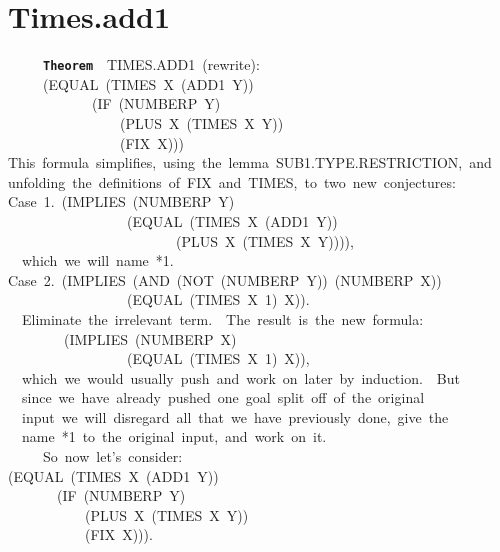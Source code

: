 \documentclass[11pt]{book}
\newenvironment{pubasis}{\begin{flushleft}\ttfamily\small}{\normalsize\rmfamily\end{flushleft}}
\newcommand{\axiomordefinition}[1]{\vspace{6pt}\texttt{\textbf{#1}}}
\newcommand{\pubdefaulttextsize}{\large}
\begin{document}
\section{Times.add1}
\pubdefaulttextsize
\begin{pubasis}
~~~~~\axiomordefinition{Theorem}~~TIMES.ADD1~(rewrite):\\
~~~~~(EQUAL~(TIMES~X~(ADD1~Y))\\
~~~~~~~~~~~~(IF~(NUMBERP~Y)\\
~~~~~~~~~~~~~~~~(PLUS~X~(TIMES~X~Y))\\
~~~~~~~~~~~~~~~~(FIX~X)))\\

This~formula~simplifies,~using~the~lemma~SUB1.TYPE.RESTRICTION,~and\\
unfolding~the~definitions~of~FIX~and~TIMES,~to~two~new~conjectures:\\

Case~1.~(IMPLIES~(NUMBERP~Y)\\
~~~~~~~~~~~~~~~~~(EQUAL~(TIMES~X~(ADD1~Y))\\
~~~~~~~~~~~~~~~~~~~~~~~~(PLUS~X~(TIMES~X~Y)))),\\

~~which~we~will~name~*1.\\

Case~2.~(IMPLIES~(AND~(NOT~(NUMBERP~Y))~(NUMBERP~X))\\
~~~~~~~~~~~~~~~~~(EQUAL~(TIMES~X~1)~X)).\\

~~Eliminate~the~irrelevant~term.~~The~result~is~the~new~formula:\\

~~~~~~~~(IMPLIES~(NUMBERP~X)\\
~~~~~~~~~~~~~~~~~(EQUAL~(TIMES~X~1)~X)),\\

~~which~we~would~usually~push~and~work~on~later~by~induction.~~But\\
~~since~we~have~already~pushed~one~goal~split~off~of~the~original\\
~~input~we~will~disregard~all~that~we~have~previously~done,~give~the\\
~~name~*1~to~the~original~input,~and~work~on~it.\\

~~~~~So~now~let's~consider:\\

(EQUAL~(TIMES~X~(ADD1~Y))\\
~~~~~~~(IF~(NUMBERP~Y)\\
~~~~~~~~~~~(PLUS~X~(TIMES~X~Y))\\
~~~~~~~~~~~(FIX~X))).\\


\end{pubasis}
\end{document}
